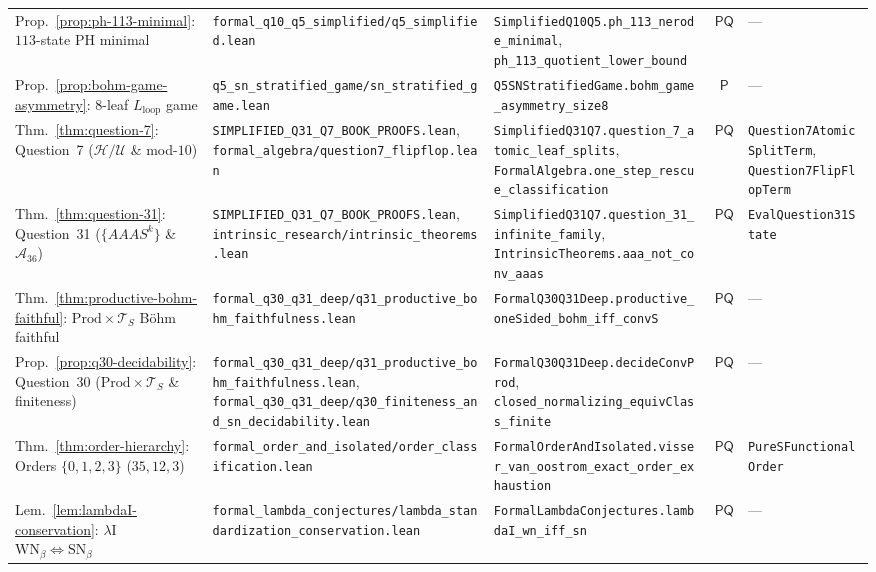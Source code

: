 \documentclass[11pt,reqno]{amsart}
\numberwithin{equation}{section}
\theoremstyle{plain}
\theoremstyle{definition}
\theoremstyle{remark}
\newcommand{\TS}{\mathcal{T}_S}
\newcommand{\SN}{\mathrm{SN}}
\newcommand{\WN}{\mathrm{WN}}
\newcommand{\Prod}{\mathrm{Prod}}
\begin{document}
\begin{table}[htbp]
\begin{tabular}{@{}lllcl@{}}
Prop.~\ref{prop:ph-113-minimal}: $113$-state $\mathrm{PH}$ minimal & \texttt{formal\_q10\_q5\_simplified/q5\_simplified.lean} & \texttt{SimplifiedQ10Q5.ph\_113\_nerode\_minimal}, \texttt{ph\_113\_quotient\_lower\_bound} & $\mathsf{PQ}$ & --- \\
Prop.~\ref{prop:bohm-game-asymmetry}: $8$-leaf $L_{\mathrm{loop}}$ game & \texttt{q5\_sn\_stratified\_game/sn\_stratified\_game.lean} & \texttt{Q5SNStratifiedGame.bohm\_game\_asymmetry\_size8} & $\mathsf{P}$ & --- \\
Thm.~\ref{thm:question-7}: Question~7 ($\mathcal{H}/\mathcal{U}$ \& mod-$10$) & \texttt{SIMPLIFIED\_Q31\_Q7\_BOOK\_PROOFS.lean}, \texttt{formal\_algebra/question7\_flipflop.lean} & \texttt{SimplifiedQ31Q7.question\_7\_atomic\_leaf\_splits}, \texttt{FormalAlgebra.one\_step\_rescue\_classification} & $\mathsf{PQ}$ & \texttt{Question7AtomicSplitTerm}, \texttt{Question7FlipFlopTerm} \\
Thm.~\ref{thm:question-31}: Question~31 ($\{A A A S^k\}$ \& $\mathcal{A}_{36}$) & \texttt{SIMPLIFIED\_Q31\_Q7\_BOOK\_PROOFS.lean}, \texttt{intrinsic\_research/intrinsic\_theorems.lean} & \texttt{SimplifiedQ31Q7.question\_31\_infinite\_family}, \texttt{IntrinsicTheorems.aaa\_not\_conv\_aaas} & $\mathsf{PQ}$ & \texttt{EvalQuestion31State} \\
Thm.~\ref{thm:productive-bohm-faithful}: $\Prod \times \TS$ B\"ohm faithful & \texttt{formal\_q30\_q31\_deep/q31\_productive\_bohm\_faithfulness.lean} & \texttt{FormalQ30Q31Deep.productive\_oneSided\_bohm\_iff\_convS} & $\mathsf{PQ}$ & --- \\
Prop.~\ref{prop:q30-decidability}: Question~30 ($\Prod \times \TS$ \& finiteness) & \texttt{formal\_q30\_q31\_deep/q31\_productive\_bohm\_faithfulness.lean}, \texttt{formal\_q30\_q31\_deep/q30\_finiteness\_and\_sn\_decidability.lean} & \texttt{FormalQ30Q31Deep.decideConvProd}, \texttt{closed\_normalizing\_equivClass\_finite} & $\mathsf{PQ}$ & --- \\
Thm.~\ref{thm:order-hierarchy}: Orders $\{0,1,2,3\}$ ($35,12,3$) & \texttt{formal\_order\_and\_isolated/order\_classification.lean} & \texttt{FormalOrderAndIsolated.visser\_van\_oostrom\_exact\_order\_exhaustion} & $\mathsf{PQ}$ & \texttt{PureSFunctionalOrder} \\
Lem.~\ref{lem:lambdaI-conservation}: $\lambda\mathrm{I}$ $\WN_\beta \iff \SN_\beta$ & \texttt{formal\_lambda\_conjectures/lambda\_standardization\_conservation.lean} & \texttt{FormalLambdaConjectures.lambdaI\_wn\_iff\_sn} & $\mathsf{PQ}$ & --- \\

\end{tabular}
\end{table}
\end{document}
